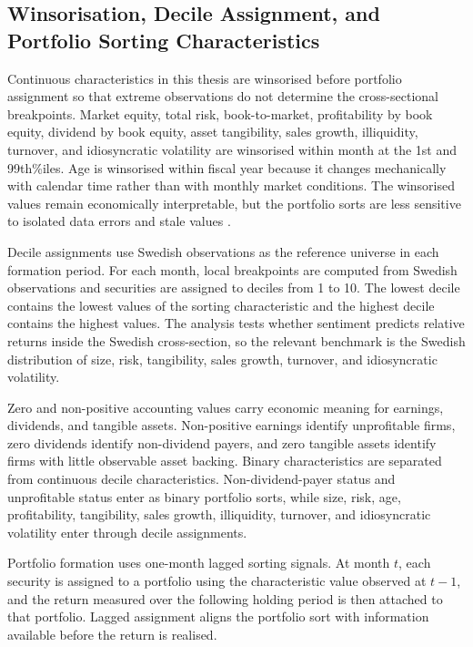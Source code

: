 \documentclass[11pt]{article}
\newcommand{\var}[1]{\ensuremath{#1}}
\begin{document}
\subsection{Winsorisation, Decile Assignment, and Portfolio Sorting Characteristics}
Continuous characteristics in this thesis are winsorised before portfolio assignment so that extreme observations do not determine the cross-sectional breakpoints. Market equity, total risk, book-to-market, profitability by book equity, dividend by book equity, asset tangibility, sales growth, illiquidity, turnover, and idiosyncratic volatility are winsorised within month at the 1st and 99th\%iles. Age is winsorised within fiscal year because it changes mechanically with calendar time rather than with monthly market conditions. The winsorised values remain economically interpretable, but the portfolio sorts are less sensitive to isolated data errors and stale values \citep{baker2006sentiment}.

Decile assignments use Swedish observations as the reference universe in each formation period. For each month, local breakpoints are computed from  Swedish observations and securities are assigned to deciles from 1 to 10. The lowest decile contains the lowest values of the sorting characteristic and the highest decile contains the highest values. The analysis tests whether sentiment predicts relative returns inside the Swedish cross-section, so the relevant benchmark is the Swedish distribution of size, risk, tangibility, sales growth, turnover, and idiosyncratic volatility.

Zero and non-positive accounting values carry economic meaning for earnings, dividends, and tangible assets. Non-positive earnings identify unprofitable firms, zero dividends identify non-dividend payers, and zero tangible assets identify firms with little observable asset backing. Binary characteristics are separated from continuous decile characteristics. Non-dividend-payer status and unprofitable status enter as binary portfolio sorts, while size, risk, age, profitability, tangibility, sales growth, illiquidity, turnover, and idiosyncratic volatility enter through decile assignments.

Portfolio formation uses one-month lagged sorting signals. At month \var{t}, each security is assigned to a portfolio using the characteristic value observed at \var{t-1}, and the return measured over the following holding period is then attached to that portfolio. Lagged assignment aligns the portfolio sort with information available before the return is realised.
\end{document}
